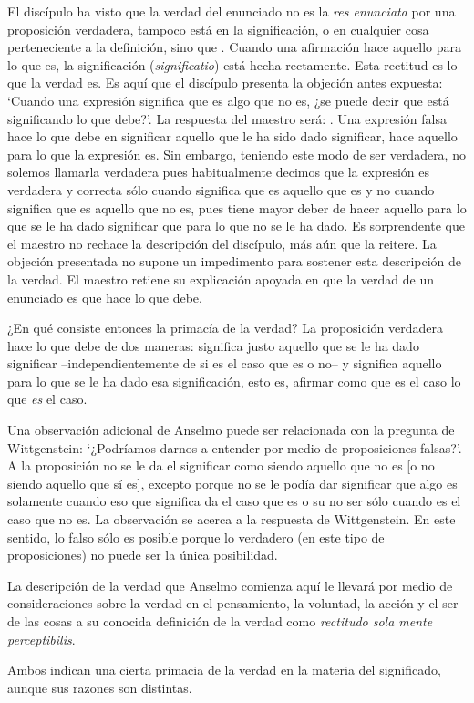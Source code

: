 El discípulo ha visto que la verdad del enunciado no es la \emph{res enunciata}
por una proposición verdadera, tampoco está en la significación, o en cualquier
cosa perteneciente a la definición, sino que .
Cuando una afirmación hace aquello para lo que es, la significación
(\emph{significatio}) está hecha rectamente. Esta rectitud es lo que la verdad
es. Es aquí que el discípulo presenta la objeción antes expuesta: `Cuando una
expresión significa que es algo que no es, ¿se puede decir que está significando
lo que debe?'. La respuesta del maestro será: . Una expresión falsa hace lo que
debe en significar aquello que le ha sido dado significar, hace aquello para lo
que la expresión es. Sin embargo, teniendo este modo de ser verdadera, no
solemos llamarla verdadera pues habitualmente decimos que la expresión es
verdadera y correcta sólo cuando significa que es aquello que es y no cuando
significa que es aquello que no es, pues tiene mayor deber de hacer aquello para
lo que se le ha dado significar que para lo que no se le ha dado. Es
sorprendente que el maestro no rechace la descripción del discípulo, más aún que
la reitere. La objeción presentada no supone un impedimento para sostener esta
descripción de la verdad. El maestro retiene su explicación apoyada en que la
verdad de un enunciado es que hace lo que debe.

¿En qué consiste entonces la primacía de la verdad? La proposición verdadera
hace lo que debe de dos maneras: significa justo aquello que se le ha dado
significar --independientemente de si es el caso que es o no-- y significa
aquello para lo que se le ha dado esa significación, esto es, afirmar como que
es el caso lo que \emph{es} el caso.

Una observación adicional de Anselmo puede ser relacionada con la pregunta de
Wittgenstein: `¿Podríamos darnos a entender por medio de proposiciones falsas?'.
A la proposición no se le da el significar como siendo aquello que no es [o no
siendo aquello que sí es], excepto porque no se le podía dar significar que algo
es solamente cuando eso que significa da el caso que es o su no ser sólo cuando
es el caso que no es. La observación se acerca a la respuesta de Wittgenstein.
En este sentido, lo falso sólo es posible porque lo verdadero (en este tipo de
proposiciones) no puede ser la única posibilidad.

La descripción de la verdad que Anselmo comienza aquí le llevará por medio de
consideraciones sobre la verdad en el pensamiento, la voluntad, la acción y el
ser de las cosas a su conocida definición de la verdad como \emph{rectitudo sola
  mente perceptibilis}.

Ambos indican una cierta primacia de la verdad en la materia del significado,
aunque sus razones son distintas.
